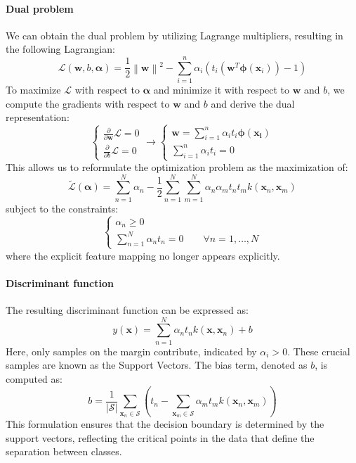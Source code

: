 \paragraph*{Dual problem}
We can obtain the dual problem by utilizing Lagrange multipliers, resulting in the following Lagrangian:
\[\mathcal{L}(\textbf{w},b,\boldsymbol{\alpha})=\dfrac{1}{2}\left\lVert \textbf{w}\right\rVert^2-\sum_{i=1}^n{\alpha_i(t_i(\textbf{w}^T\boldsymbol{\phi}(\textbf{x}_i))-1)} \]
To maximize $\mathcal{L}$ with respect to $\boldsymbol{\alpha}$ and minimize it with respect to $\mathbf{w}$ and $b$, we compute the gradients with respect to $\mathbf{w}$ and $b$ and derive the dual representation:
\[\begin{cases}
    \frac{\partial}{\partial\textbf{w}}\mathcal{L}=0 \\
    \frac{\partial}{\partial b}\mathcal{L}=0
\end{cases} \rightarrow \begin{cases}
    \textbf{w}=\sum_{i=1}^{n}{\alpha_i t_i\boldsymbol{\phi(\textbf{x}_i)}}\\
    \sum_{i=1}^{n}{\alpha_i t_i}=0
\end{cases}\]
This allows us to reformulate the optimization problem as the maximization of:
\[\tilde{\mathcal{L}}(\boldsymbol{\alpha})=\sum_{n=1}^N \alpha_n-\dfrac{1}{2}\sum_{n=1}^N\sum_{m=1}^N \alpha_n\alpha_m t_n t_m k(\textbf{x}_n,\textbf{x}_m)\]
subject to the constraints: 
\[\begin{cases}
    \alpha_n\geq 0 \\
    \sum_{n=1}^{N}{\alpha_n t_n = 0} \qquad \forall n=1,\dots,N
\end{cases}\]
where the explicit feature mapping no longer appears explicitly.

\paragraph*{Discriminant function}
The resulting discriminant function can be expressed as:
\[y(\textbf{x})=\sum_{n=1}^{N}\alpha_n t_n k(\textbf{x},\textbf{x}_n)+b\]
Here, only samples on the margin contribute, indicated by $\alpha_i > 0$. 
These crucial samples are known as the Support Vectors.
The bias term, denoted as $b$, is computed as:
\[b=\dfrac{1}{\left\lvert \mathcal{S}\right\rvert }\sum_{\textbf{x}_n\in\mathcal{S}} \left(t_n-\sum_{\textbf{x}_m\in\mathcal{S}}\alpha_m t_m k(\textbf{x}_n,\textbf{x}_m)\right)\]
This formulation ensures that the decision boundary is determined by the support vectors, reflecting the critical points in the data that define the separation between classes.

